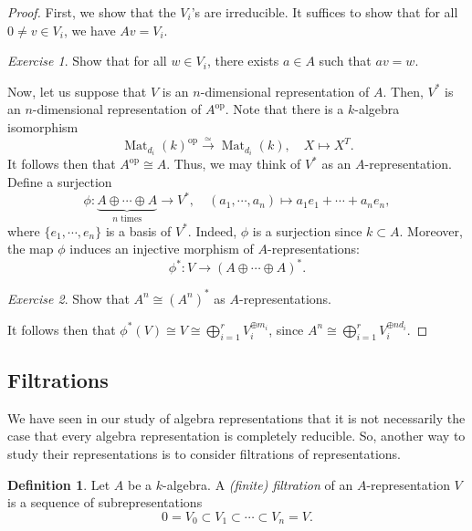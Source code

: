 \documentclass[a4paper]{report}
\theoremstyle{definition}
\newtheorem{definition}{Definition}
\theoremstyle{remark}
\theoremstyle{proposition}
\theoremstyle{conjecture}
\theoremstyle{lemma}
\theoremstyle{corollary}
\theoremstyle{exercise}
\newtheorem{exercise}{Exercise}
\theoremstyle{example}
\newcommand{\on}{\operatorname}
\begin{document}
\begin{proof}
    First, we show that the $V_i$'s are irreducible. It suffices to show that 
    for all $0\neq v\in V_i$, we have $Av = V_i$. 
    \begin{exercise}
        Show that for all $w\in V_i$, there exists $a\in A$ 
        such that $av = w$.
    \end{exercise}
    Now, let us suppose that $V$ is an $n$-dimensional representation of 
    $A$. Then, $V^\ast$ is an $n$-dimensional representation of 
    $A^{\on{op}}$. Note that there is a $k$-algebra isomorphism
    $$\on{Mat}_{d_i}(k)^{\on{op}} \stackrel{\simeq}{\longrightarrow} \on{Mat}_{d_i}(k),\quad X \longmapsto X^T.$$
    It follows then that $A^{\on{op}}\cong A$. Thus, we may think of 
    $V^\ast$ as an $A$-representation.
    Define a surjection
    $$\phi : \underbrace{A\oplus \cdots \oplus A}_{\text{$n$ times}} \longrightarrow V^\ast,\quad (a_1,\cdots,a_n) \longmapsto a_1e_1 + \cdots + a_ne_n,$$
    where $\lbrace e_1,\cdots,e_n\rbrace$ is a basis of $V^\ast$.
    Indeed, $\phi$ is a surjection since $k\subset A$. 
    Moreover, the map $\phi$ induces an injective morphism of 
    $A$-representations:
    $$\phi^\ast : V \longrightarrow (A\oplus \cdots \oplus A)^\ast.$$
    \begin{exercise}
        Show that $A^n \cong (A^n)^\ast$ as $A$-representations.
    \end{exercise}
    It follows then that $\phi^\ast(V) \cong V \cong \bigoplus_{i=1}^r V_i^{\oplus m_i}$,
    since $A^n \cong \bigoplus_{i=1}^r V_i^{\oplus nd_i}$.

\end{proof}

\subsection{Filtrations}

We have seen in our study of algebra representations that it is not 
necessarily the case that every algebra representation is completely
reducible. So, another way to study their representations is to consider
filtrations of representations.

\begin{definition}
    Let $A$ be a $k$-algebra. A \emph{(finite) filtration} of an 
    $A$-representation $V$ is a sequence of subrepresentations
    $$0 = V_0 \subset V_1 \subset \cdots \subset V_n = V.$$
\end{definition}
\end{document}
